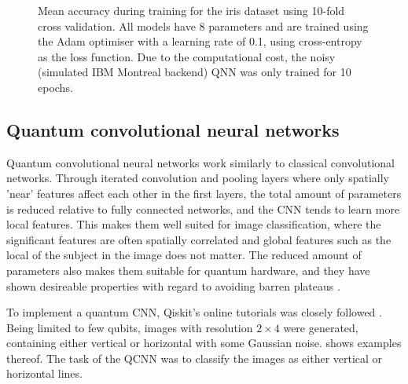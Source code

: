 \begin{figure}
    \centering
    \caption{Mean accuracy during training for the iris dataset using 10-fold cross validation. All models have 8 parameters and are trained using the Adam optimiser with a learning rate of 0.1, using cross-entropy as the loss function. Due to the computational cost, the noisy (simulated IBM Montreal backend) QNN was only trained for 10 epochs.}
    \label{fig:iris_training}
\end{figure}

\subsection{Quantum convolutional neural networks}
Quantum convolutional neural networks work similarly to classical convolutional networks. Through iterated convolution and pooling layers where only spatially 'near' features affect each other in the first layers, the total amount of parameters is reduced relative to fully connected networks, and the CNN tends to learn more local features. This makes them well suited for image classification, where the significant features are often spatially correlated and global features such as the local of the subject in the image does not matter. The reduced amount of parameters also makes them suitable for quantum hardware, and they have shown desireable properties with regard to avoiding barren plateaus \cite{pesah2021}.

To implement a quantum CNN, Qiskit's online tutorials was closely followed \cite{qiskit_qcnn}. Being limited to few qubits, images with resolution $2\times4$ were generated, containing either vertical or horizontal with some Gaussian noise.  shows examples thereof. The task of the QCNN was to classify the images as either vertical or horizontal lines.

